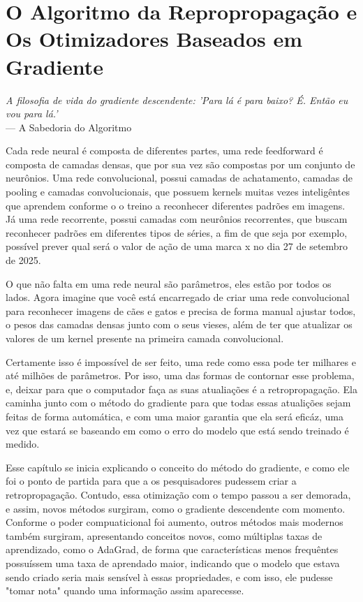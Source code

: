 
\chapter{O Algoritmo da Repropropagação e Os Otimizadores Baseados em Gradiente}
\label{cap:retropropagacao-gradiente}

\begin{flushright}
\textit{A filosofia de vida do gradiente descendente: 'Para lá é para baixo? É. Então eu vou para lá.'} \\
--- A Sabedoria do Algoritmo
\end{flushright}

Cada rede neural é composta de diferentes partes, uma rede feedforward é composta de camadas densas, que por sua vez são compostas por um conjunto de neurônios. Uma rede convolucional, possui camadas de achatamento, camadas de pooling e camadas convolucionais, que possuem kernels muitas vezes inteligêntes que aprendem conforme o o treino a reconhecer diferentes padrões em imagens. Já uma rede recorrente, possui camadas com neurônios recorrentes, que buscam reconhecer padrões em diferentes tipos de séries, a fim de que seja por exemplo, possível prever qual será o valor de ação de uma marca x no dia 27 de setembro de 2025.

O que não falta em uma rede neural são parâmetros, eles estão por todos os lados. Agora imagine que você está encarregado de criar uma rede convolucional para reconhecer imagens de cães e gatos e precisa de forma manual ajustar todos, o pesos das camadas densas junto com o seus vieses, além de ter que atualizar os valores de um kernel presente na primeira camada convolucional.

Certamente isso é impossível de ser feito, uma rede como essa pode ter milhares e até milhões de parâmetros. Por isso, uma das formas de contornar esse problema, e, deixar para que o computador faça as suas atualiações é a retropropagação. Ela caminha junto com o método do gradiente para que todas essas atualições sejam feitas de forma automática, e com uma maior garantia que ela será eficáz, uma vez que estará se baseando em como o erro do modelo que está sendo treinado é medido.

Esse capítulo se inicia explicando o conceito do método do gradiente, e como ele foi o ponto de partida para que a os pesquisadores pudessem criar a retropropagação. Contudo, essa otimização com o tempo passou a ser demorada, e assim, novos métodos surgiram, como o gradiente descendente com momento. Conforme o poder compuaticional foi aumento, outros métodos mais modernos também surgiram, apresentando conceitos novos, como múltiplas taxas de aprendizado, como o AdaGrad, de forma que características menos frequêntes possuíssem uma taxa de aprendado maior, indicando que o modelo que estava sendo criado seria mais sensível à essas propriedades, e com isso, ele pudesse "tomar nota" quando uma informação assim aparecesse.

